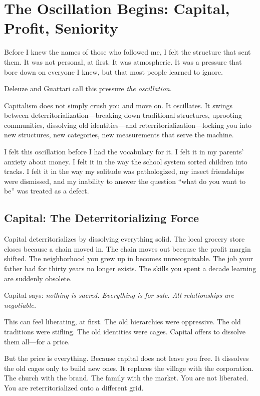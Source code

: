 \documentclass[11pt,openany]{book}
\begin{document}
\chapter{The Oscillation Begins: Capital, Profit, Seniority}

Before I knew the names of those who followed me, I felt the structure that sent them. It was not personal, at first. It was atmospheric. It was a pressure that bore down on everyone I knew, but that most people learned to ignore.

Deleuze and Guattari call this pressure \textit{the oscillation}.

Capitalism does not simply crush you and move on. It oscillates. It swings between deterritorialization---breaking down traditional structures, uprooting communities, dissolving old identities---and reterritorialization---locking you into new structures, new categories, new measurements that serve the machine.

I felt this oscillation before I had the vocabulary for it. I felt it in my parents' anxiety about money. I felt it in the way the school system sorted children into tracks. I felt it in the way my solitude was pathologized, my insect friendships were dismissed, and my inability to answer the question ``what do you want to be'' was treated as a defect.

\section*{Capital: The Deterritorializing Force}

Capital deterritorializes by dissolving everything solid. The local grocery store closes because a chain moved in. The chain moves out because the profit margin shifted. The neighborhood you grew up in becomes unrecognizable. The job your father had for thirty years no longer exists. The skills you spent a decade learning are suddenly obsolete.

Capital says: \textit{nothing is sacred. Everything is for sale. All relationships are negotiable.}

This can feel liberating, at first. The old hierarchies were oppressive. The old traditions were stifling. The old identities were cages. Capital offers to dissolve them all---for a price.

But the price is everything. Because capital does not leave you free. It dissolves the old cages only to build new ones. It replaces the village with the corporation. The church with the brand. The family with the market. You are not liberated. You are reterritorialized onto a different grid.
\end{document}
